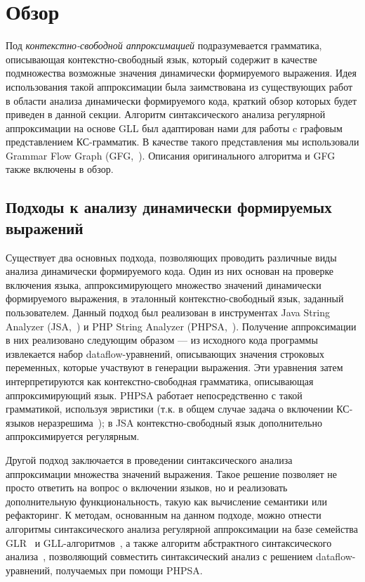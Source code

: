 \section{Обзор}

Под \textit{контекстно-свободной аппроксимацией} подразумевается грамматика, описывающая контекстно-свободный язык, который содержит в качестве подмножества возможные значения динамически формируемого выражения. 
Идея использования такой аппроксимации была заимствована из существующих работ в области анализа динамически формируемого кода, краткий обзор которых будет приведен в данной секции. 
Алгоритм синтаксического анализа регулярной аппроксимации на основе GLL был адаптирован нами для работы c графовым представлением КС-грамматик. 
В качестве такого представления мы использовали Grammar Flow Graph (GFG,~\cite{gfg}). Описания оригинального алгоритма и GFG также включены в обзор. 

\subsection{Подходы к анализу динамически формируемых выражений}

Существует два основных подхода, позволяющих проводить различные виды анализа динамически формируемого кода. 
Один из них основан на проверке включения языка, аппроксимирующего множество значений динамически формируемого выражения, в эталонный контекстно-свободный язык, заданный пользователем. 
Данный подход был реализован в инструментах Java String Analyzer (JSA,~\cite{jsa}) и PHP String Analyzer (PHPSA,~\cite{phpsa}).
Получение аппроксимации в них реализовано следующим образом --- из исходного кода программы извлекается набор dataflow-уравнений, описывающих значения строковых переменных, которые участвуют в генерации выражения. 
Эти уравнения затем интерпретируются как контекстно-свободная грамматика, описывающая аппроксимирующий язык. 
PHPSA работает непосредственно с такой грамматикой, используя эвристики (т.к. в общем случае задача о включении КС-языков неразрешима~\cite{lang_inclusion}); в JSA контекстно-свободный язык дополнительно аппроксимируется регулярным.

Другой подход заключается в проведении синтаксического анализа аппроксимации множества значений выражения. 
Такое решение позволяет не просто ответить на вопрос о включении языков, но и реализовать дополнительную функциональность, такую как вычисление семантики или рефакторинг. 
К методам, основанным на данном подходе, можно отнести алгоритмы синтаксического анализа регулярной аппроксимации на базе семейства GLR~\cite{alvor, rnglr_reg} и GLL-алгоритмов~\cite{gll_reg}, а также алгоритм абстрактного синтаксического анализа~\cite{a_lr}, позволяющий совместить синтаксический анализ с решением dataflow-уравнений, получаемых при помощи PHPSA.

